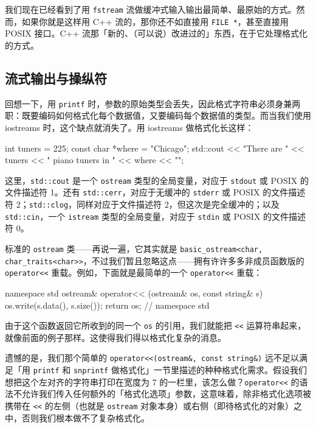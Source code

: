 我们现在已经看到了用 \texttt{fstream} 流做缓冲式输入输出最简单、最原始的方式。然而，如果你就是这样用 C++ 流的，那你还不如直接用 \texttt{FILE *}，甚至直接用 POSIX 接口。C++ 流那「新的、（可以说）改进过的」东西，在于它处理格式化的方式。

\subsection{流式输出与操纵符}

回想一下，用 \texttt{printf} 时，参数的原始类型会丢失，因此格式字符串必须身兼两职：既要编码如何格式化每个数据值，又要编码每个数据值的类型。而当我们使用 iostreams 时，这个缺点就消失了。用 iostreams 做格式化长这样：

\begin{codebox}[cpp]
    int tuners = 225;
    const char *where = "Chicago";
    std::cout << "There are " << tuners << " piano tuners in " << where <<
"\n";
\end{codebox}

这里，\texttt{std::\allowbreak{}cout} 是一个 \texttt{ostream} 类型的全局变量，对应于 \texttt{stdout} 或 POSIX 的文件描述符 1。还有 \texttt{std::\allowbreak{}cerr}，对应于无缓冲的 \texttt{stderr} 或 POSIX 的文件描述符 2；\texttt{std::\allowbreak{}clog}，同样对应于文件描述符 2，但这次是完全缓冲的；以及 \texttt{std::\allowbreak{}cin}，一个 \texttt{istream} 类型的全局变量，对应于 \texttt{stdin} 或 POSIX 的文件描述符 0。

标准的 \texttt{ostream} 类——再说一遍，它其实就是 \texttt{basic\_\allowbreak{}ostream<\allowbreak{}char,\allowbreak{}} \texttt{char\_\allowbreak{}traits<char>{}>}，不过我们暂且忽略这点——拥有许许多多非成员函数版的 \texttt{operator<<} 重载。例如，下面就是最简单的一个 \texttt{operator<<} 重载：

\begin{codebox}[cpp]
    namespace std {
      ostream& operator<< (ostream& os, const string& s)
      {
        os.write(s.data(), s.size());
        return os;
      }
    } // namespace std
\end{codebox}

由于这个函数返回它所收到的同一个 \texttt{os} 的引用，我们就能把 \texttt{<<} 运算符串起来，就像前面的例子那样。这使得我们得以格式化复杂的消息。

遗憾的是，我们那个简单的 \texttt{operator<<(\allowbreak{}ostream\&,\allowbreak{} const string\&)\allowbreak{}} 远不足以满足「用 \texttt{printf} 和 \texttt{snprintf} 做格式化」一节里描述的种种格式化需求。假设我们想把这个左对齐的字符串打印在宽度为 7 的一栏里，该怎么做？\texttt{operator<<} 的语法不允许我们传入任何额外的「格式化选项」参数，这意味着，除非格式化选项被携带在 \texttt{<<} 的左侧（也就是 \texttt{ostream} 对象本身）或右侧（即待格式化的对象）之中，否则我们根本做不了复杂格式化。

